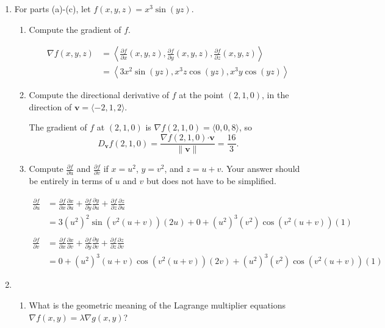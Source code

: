 \documentclass[12pt]{article}
\newcommand{\points}[1]{\marginpar{\hspace{24pt}[#1]}}
\newcommand{\dotp}{\boldsymbol{\cdot}}
\newcommand{\di}{\displaystyle}
\newcommand{\pd}[2]{\frac{\partial #1}{\partial #2}}
\newcommand{\len}[1]{\lVert #1\rVert}
\begin{document}
\begin{enumerate}
\item For parts (a)-(c), let $f(x,y,z) = x^3\sin (yz)$.
\begin{enumerate}
\item Compute the gradient of $f$. \points{3}

\bigskip

\begin{align*}
\nabla f(x,y,z) & = \left<\pd{f}{x}(x,y,z),\pd{f}{y}(x,y,z), \pd{f}{z}(x,y,z)\right>\\
& = \left<3x^2\sin(yz), x^3z\cos(yz), x^3y\cos(yz)\right>
\end{align*}

\bigskip

\item Compute the directional derivative of $f$ at the point $(2,1,0)$, in the direction of $\mathbf{v} = \langle -2,1,2\rangle$.\points{3}

\bigskip

The gradient of $f$ at $(2,1,0)$ is $\nabla f(2,1,0) = \langle 0, 0, 8\rangle$, so
\[
D_{\mathbf{v}}f(2,1,0) = \frac{\nabla f(2,1,0)\dotp \mathbf{v}}{\len{\mathbf{v}}} = \frac{16}{3}.
\]

\bigskip

\item Compute $\di \pd{f}{u}$ and $\di \pd{f}{v}$ if $x = u^2$, $y=v^2$, and $z=u+v$.\points{6}
Your answer should be entirely in terms of $u$ and $v$ but does not have to be simplified.

\bigskip

\begin{align*}
\pd{f}{u} & = \pd{f}{x}\pd{x}{u}+\pd{f}{y}\pd{y}{u}+\pd{f}{z}\pd{z}{u}\\
& = 3(u^2)^2\sin(v^2(u+v))(2u)+0+(u^2)^3(v^2)\cos(v^2(u+v))(1)\\
& \\
\pd{f}{v} & = \pd{f}{x}\pd{x}{v}+\pd{f}{y}\pd{y}{v}+\pd{f}{z}\pd{z}{v}\\
& = 0+(u^2)^3(u+v)\cos(v^2(u+v))(2v)+(u^2)^3(v^2)\cos(v^2(u+v))(1)
\end{align*}
\end{enumerate}
\newpage

\item \begin{enumerate}
\item What is the geometric meaning of the Lagrange multiplier equations\\ $\nabla f(x,y) = \lambda \nabla g(x,y)$?\points{3}


\end{enumerate}
\end{enumerate}
\end{document}
